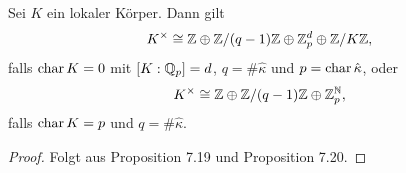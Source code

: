 \begin{Satz}
	Sei $K$ ein lokaler Körper. Dann gilt
	\[ K^\times \cong \mathbb{Z} \oplus \mathbb{Z} / (q-1) \mathbb{Z} \oplus \mathbb{Z}_p^d \oplus \mathbb{Z} / K\mathbb{Z},
	\]
	falls $\operatorname{char} K = 0$ mit $[K:\mathbb{Q}_p] = d$, $q = \#\hat{\kappa}$ und $p = \operatorname{char} \hat{\kappa}$, oder
	\[ K^\times \cong \mathbb{Z} \oplus \mathbb{Z} / (q-1) \mathbb{Z} \oplus \mathbb{Z}_p^{\mathbb{N}},
	\]
	falls $\operatorname{char} K = p$ und $q = \#\hat{\kappa}$.
\end{Satz}

\begin{proof}
	Folgt aus Proposition 7.19 und Proposition 7.20.
\end{proof}







